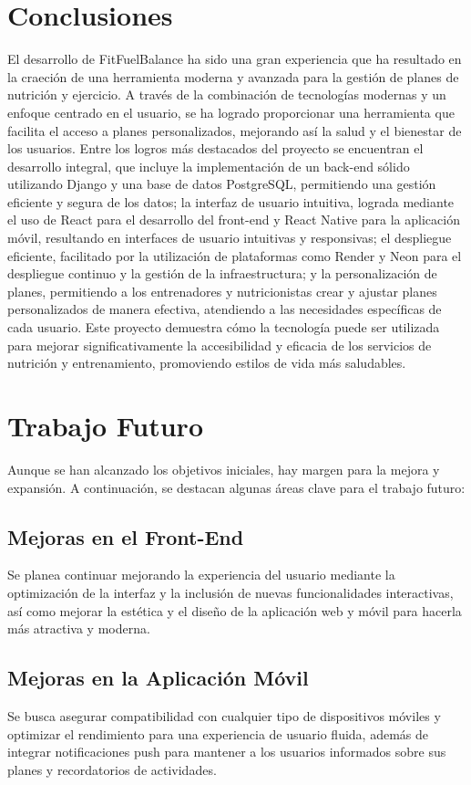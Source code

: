 \label{sec:conclusiones}

\section{Conclusiones}
El desarrollo de FitFuelBalance ha sido una gran experiencia que ha resultado en la craeción de una herramienta moderna y avanzada para la gestión de planes de nutrición y ejercicio. A través de la combinación de tecnologías modernas y un enfoque centrado en el usuario, se ha logrado proporcionar una herramienta que facilita el acceso a planes personalizados, mejorando así la salud y el bienestar de los usuarios. Entre los logros más destacados del proyecto se encuentran el desarrollo integral, que incluye la implementación de un back-end sólido utilizando Django y una base de datos PostgreSQL, permitiendo una gestión eficiente y segura de los datos; la interfaz de usuario intuitiva, lograda mediante el uso de React para el desarrollo del front-end y React Native para la aplicación móvil, resultando en interfaces de usuario intuitivas y responsivas; el despliegue eficiente, facilitado por la utilización de plataformas como Render y Neon para el despliegue continuo y la gestión de la infraestructura; y la personalización de planes, permitiendo a los entrenadores y nutricionistas crear y ajustar planes personalizados de manera efectiva, atendiendo a las necesidades específicas de cada usuario. Este proyecto demuestra cómo la tecnología puede ser utilizada para mejorar significativamente la accesibilidad y eficacia de los servicios de nutrición y entrenamiento, promoviendo estilos de vida más saludables.

\section{Trabajo Futuro}
Aunque se han alcanzado los objetivos iniciales, hay margen para la mejora y expansión. A continuación, se destacan algunas áreas clave para el trabajo futuro:

\subsection{Mejoras en el Front-End}
Se planea continuar mejorando la experiencia del usuario mediante la optimización de la interfaz y la inclusión de nuevas funcionalidades interactivas, así como mejorar la estética y el diseño de la aplicación web y móvil para hacerla más atractiva y moderna.

\subsection{Mejoras en la Aplicación Móvil}
Se busca asegurar compatibilidad con cualquier tipo de dispositivos móviles y optimizar el rendimiento para una experiencia de usuario fluida, además de integrar notificaciones push para mantener a los usuarios informados sobre sus planes y recordatorios de actividades.

